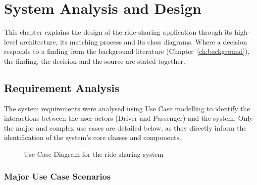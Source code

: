 \chapter{System Analysis and Design}
\label{ch:design}

This chapter explains the design of the ride-sharing application through its high-level architecture, its matching process and its class diagrams. Where a decision responds to a finding from the background literature (Chapter~\ref{ch:background}), the finding, the decision and the source are stated together.

\section{Requirement Analysis}

The system requirements were analysed using Use Case modelling to identify the interactions between the user actors (Driver and Passenger) and the system. Only the major and complex use cases are detailed below, as they directly inform the identification of the system's core classes and components.

\begin{figure}[htbp]
	\centering
	\caption{Use Case Diagram for the ride-sharing system}
	\label{fig:usecase}
\end{figure}

\subsection{Major Use Case Scenarios}

